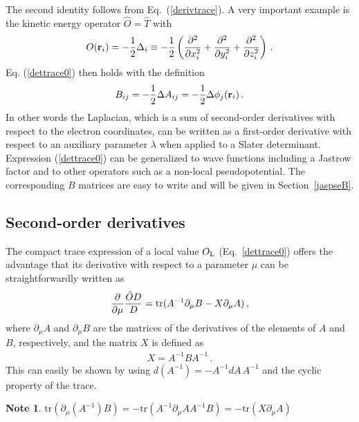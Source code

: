 \documentclass[aip,jcp,reprint,floatfix,onecolumn]{revtex4-1}
\newtheorem*{note}{Note}
\def\tr{\text{tr}}
\def\wdet{D}
\begin{document}
The second identity follows from Eq.~(\ref{derivtrace}).
A very important example is the kinetic energy operator $\hat{O}=\hat{T}$ with
\begin{equation}
O({\bf r}_i)  = -\frac{1}{2}\Delta_i   \equiv -\frac{1}{2} \left(\frac{\partial^2}{\partial x_i^2}+
\frac{\partial^2}{\partial y_i^2} + \frac{\partial^2}{\partial z_i^2}\right) \,.
\end{equation}
Eq. (\ref{dettrace0}) then holds with the definition
\begin{equation}
B_{ij} = -\frac{1}{2}\Delta A_{ij} =- \frac{1}{2} \Delta \phi_j ({\bf r}_i)\,.
\label{B_kin_det}
\end{equation}
In other words the Laplacian, which is a sum of second-order derivatives with respect to the electron coordinates, can be written as a  first-order derivative  with respect to an auxiliary parameter $\lambda$  when applied to a Slater determinant.
Expression
(\ref{dettrace0}) can be generalized to wave functions including a Jastrow factor and to other operators such as a non-local pseudopotential.
The corresponding $B$ matrices are easy   to write and will be given in
Section~\ref{jaspseB}.

\subsection{Second-order derivatives}
\label{2deriv_1det}

The compact trace expression of a local value $O_{\rm L}$ (Eq.~\ref{dettrace0}) offers the advantage that its derivative with respect to a parameter $\mu$ can be straightforwardly written as
\begin{eqnarray}
\frac{\partial}{\partial \mu}\frac{\hat{O}\wdet}{\wdet}
={\rm tr}(A^{-1}\partial_\mu B-X\partial_\mu A)\,,
\label{dm_dettrace0}
\end{eqnarray}
where $\partial_\mu A$ and $\partial_\mu B$ are the matrices of the derivatives of the elements of $A$ and $B$, respectively, and the matrix
$X$ is defined as
\begin{eqnarray}
X=A^{-1}{B}A^{-1}\,.
\label{X_mat}
\end{eqnarray}
This can easily be shown by using $d(A^{-1})=-A^{-1}dA\,A^{-1}$ and the cyclic property of the trace.

\begin{note}
$\tr(\partial_\mu (A^{-1}) B) = - \tr(A^{-1}\partial_\mu A A^{-1} B) = - \tr(X\partial_\mu A)$
\end{note}
\end{document}
